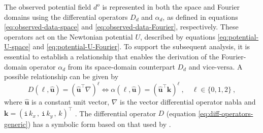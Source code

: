 The observed potential field $d^{o}$ is represented in both the space and Fourier 
domains using the differential operators $D_{d}$ and $\alpha_{d}$, as defined in equations 
\ref{eq:observed-data-space} and \ref{eq:observed-data-Fourier}, respectively. 
These operators act on the Newtonian potential $U$, described by equations 
\ref{eq:potential-U-space} and \ref{eq:potential-U-Fourier}. To support the subsequent analysis, 
it is essential to establish a relationship that enables the derivation of the Fourier-domain 
operator $\alpha_{d}$ from its space-domain counterpart $D_{d}$ and vice-versa.  
A possible relationship can be given by
\begin{equation}
	D(\ell, \hat{\mathbf{u}}) = 
	\left( \hat{\mathbf{u}}^{\top} \nabla \right)^{\ell} \Leftrightarrow
	\alpha(\ell, \hat{\mathbf{u}}) = \left( \hat{\mathbf{u}}^{\top} \mathbf{k} \right)^{\ell} \: ,
	\quad \ell \in \{ 0, 1, 2 \} \: ,
	\label{eq:diff-operators-generic}
\end{equation}
where $\hat{\mathbf{u}}$ is a constant unit vector,
$\nabla$ is the vector differential operator nabla \citep[e.g.,][ p. 179]{kaplan2002} and 
$\mathbf{k} = ( \mathtt{i} \, k_{x} \, , \, \mathtt{i} \, k_{y} \, , \, k)^{\top}$
\citep{pedersen1978}.
The differential operator $D$ (equation \ref{eq:diff-operators-generic})
has a symbolic form based on that used by \citet[][ p. 179]{kaplan2002}.

